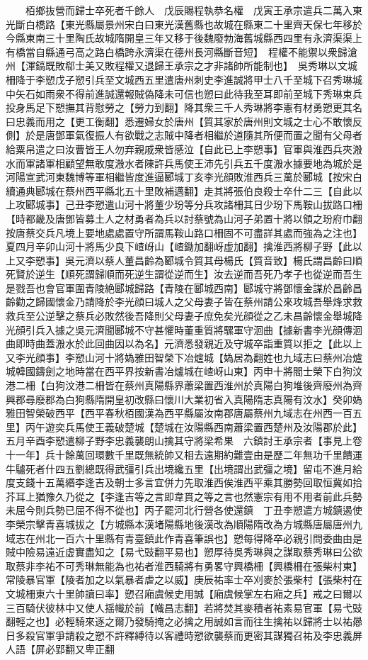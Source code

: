 　　栢鄉抜營而歸士卒死者千餘人　戊辰賜程執恭名權　戊寅王承宗遣兵二萬入東光斷白橋路【東光縣屬景州宋白曰東光漢舊縣也故城在縣東二十里齊天保七年移於今縣東南三十里陶氏故城隋開皇三年又移于後魏廢勃海舊城縣西四里有永濟渠渠上有橋當自縣通弓高之路白橋跨永濟渠在德州長河縣斷音短】　程權不能禦以衆歸滄州【渾鎬既敗郗士美又敗程權又退歸王承宗之才非諸帥所能制也】　吳秀琳以文城柵降于李愬戊子愬引兵至文城西五里遣唐州刺史李進誠將甲士八千至城下召秀琳城中矢石如雨衆不得前進誠還報賊偽降未可信也愬曰此待我至耳即前至城下秀琳束兵投身馬足下愬撫其背慰勞之【勞力到翻】降其衆三千人秀琳將李憲有材勇愬更其名曰忠義而用之【更工衡翻】悉遷婦女於唐州【質其家於唐州則文城之士心不敢懷反側】於是唐鄧軍氣復振人有欲戰之志賊中降者相繼於道隨其所便而置之聞有父母者給粟帛遣之曰汝曹皆王人勿弃親戚衆皆感泣【自此已上李愬事】官軍與淮西兵夾溵水而軍諸軍相顧望無敢度溵水者陳許兵馬使王沛先引兵五千度溵水據要地為城於是河陽宣武河東魏博等軍相繼皆度進逼郾城丁亥李光顔敗淮西兵三萬於郾城【按宋白續通典郾城在蔡州西平縣北五十里敗補邁翻】走其將張伯良殺士卒什二三【自此以上攻郾城事】己丑李愬遣山河十將董少玢等分兵攻諸柵其日少玢下馬鞍山拔路口柵【時都畿及唐鄧皆募土人之材勇者為兵以討蔡號為山河子弟置十將以領之玢府巾翻按唐蔡交兵凡境上要地處處置守所謂馬鞍山路口柵固不可盡詳其處而強為之注也】夏四月辛卯山河十將馬少良下嵖岈山【嵖鋤加翻岈虚加翻】擒淮西將柳子野【此以上又李愬事】吳元濟以蔡人董昌齡為郾城令質其母楊氏【質音致】楊氏謂昌齡曰順死賢於逆生【順死謂歸順而死逆生謂從逆而生】汝去逆而吾死乃孝子也從逆而吾生是戮吾也會官軍圍青陵絶郾城歸路【青陵在郾城西南】郾城守將鄧懷金謀於昌齡昌齡勸之歸國懷金乃請降於李光顔曰城人之父母妻子皆在蔡州請公來攻城吾舉烽求救救兵至公逆擊之蔡兵必敗然後吾降則父母妻子庶免矣光顔從之乙未昌齡懷金舉城降光顔引兵入據之吳元濟聞郾城不守甚懼時董重質將騾軍守洄曲【據新書李光顔傳洄曲即時曲蓋溵水於此回曲因以為名】元濟悉發親近及守城卒詣重質以拒之【此以上又李光顔事】李愬山河十將媯雅田智榮下冶爐城【媯居為翻姓也九域志曰蔡州冶爐城韓國鑄劍之地時當在西平界按新書冶爐城在嵖岈山東】丙申十將閻士榮下白狗汶港二柵【白狗汶港二柵皆在蔡州真陽縣界蕭梁置西淮州於真陽白狗堆後齊廢州為齊興郡尋廢郡為白狗縣隋開皇初改縣曰懷川大業初省入真陽隋志真陽有汶水】癸卯媯雅田智榮破西平【西平春秋栢國漢為西平縣屬汝南郡唐屬蔡州九域志在州西一百五里】丙午遊奕兵馬使王義破楚城【楚城在汝陽縣西南蕭梁置西楚州及汝陽郡於此】　五月辛酉李愬遣柳子野李忠義襲朗山擒其守將梁希果　六鎮討王承宗者【事見上卷十一年】兵十餘萬回環數千里既無統帥又相去遠期約難壹由是歷二年無功千里饋運牛驢死者什四五劉總既得武彊引兵出境纔五里【出境謂出武彊之境】留屯不進月給度支錢十五萬緡李逢吉及朝士多言宜併力先取淮西俟淮西平乘其勝勢回取恒冀如拾芥耳上猶豫久乃從之【李逢吉等之言即韋貫之等之言也然憲宗有用不用者前此兵勢未屈今則兵勢已屈不得不從也】丙子罷河北行營各使還鎮　丁丑李愬遣方城鎮遏使李榮宗擊青喜城拔之【方城縣本漢堵陽縣地後漢改為順陽隋改為方城縣唐屬唐州九域志在州北一百六十里縣有青臺鎮此作青喜筆誤也】愬每得降卒必親引問委曲由是賊中險易遠近虚實盡知之【易弋豉翻平易也】愬厚待吳秀琳與之謀取蔡秀琳曰公欲取蔡非李祐不可秀琳無能為也祐者淮西騎將有勇畧守興橋柵【興橋柵在張柴村東】常陵暴官軍【陵者加之以氣暴者虐之以威】庚辰祐率士卒刈麥於張柴村【張柴村在文城柵東六十里帥讀曰率】愬召廂虞候史用誠【廂虞候掌左右廂之兵】戒之曰爾以三百騎伏彼林中又使人揺幟於前【幟昌志翻】若將焚其麥積者祐素易官軍【易弋豉翻輕之也】必輕騎來逐之爾乃發騎掩之必擒之用誠如言而往生擒祐以歸將士以祐曏日多殺官軍爭請殺之愬不許釋縛待以客禮時愬欲襲蔡而更密其謀獨召祐及李忠義屏人語【屏必郢翻又卑正翻